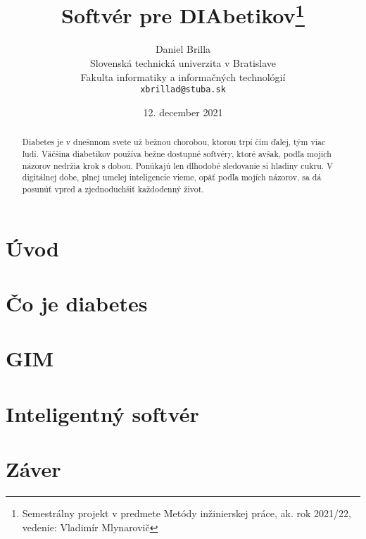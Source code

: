 \documentclass[10pt,slovak,a4paper]{article}
\title{Softvér pre DIAbetikov\thanks{Semestrálny projekt v predmete Metódy inžinierskej práce, ak. rok 2021/22, vedenie: Vladimír Mlynarovič}}
\author{Daniel Brilla\\[2pt]
	{\small Slovenská technická univerzita v Bratislave}\\
	{\small Fakulta informatiky a informačných technológií}\\
	{\small \texttt{xbrillad@stuba.sk}}
	}
\date{\small 12. december 2021}
\begin{document}
\maketitle

\begin{abstract}
Diabetes je v dnešnnom svete už bežnou chorobou, ktorou trpí čím ďalej, tým viac ľudí. Väčšina diabetikov používa bežne dostupné softvéry, ktoré avšak, podľa mojich názorov nedržia krok s dobou. Ponúkajú len dlhodobé sledovanie si hladiny cukru. V digitálnej dobe, plnej umelej inteligencie vieme, opäť podľa mojích názorov, sa dá posunúť vpred a zjednoduchšiť každodenný život. 
\end{abstract}



\section{Úvod}



\section{Čo je diabetes} \label{diabetes}



\section{GIM} \label{GIM}



\section{Inteligentný softvér} \label{int-soft}




\section{Záver} \label{zaver}





\newpage
	
\end{document}
